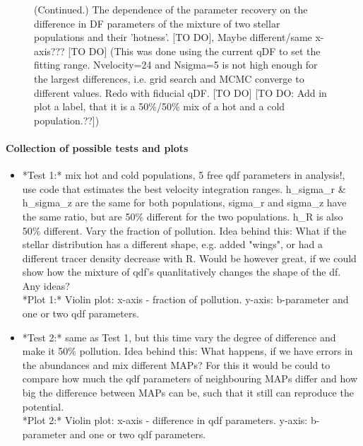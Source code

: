 \documentclass[12pt,preprint]{aastex}
\begin{document}
\addtocounter{figure}{-1}
\begin{figure} [t!]
  \caption{(Continued.) The dependence of the parameter recovery on the difference in DF parameters of the mixture of two stellar populations and their 'hotness'.  [TO DO], Maybe different/same x-axis??? [TO DO] (This was done using the current qDF to set the fitting range. Nvelocity=24 and Nsigma=5 is not high enough for the largest differences, i.e. grid search and MCMC converge to different values. Redo with fiducial qDF. [TO DO] [TO DO: Add in plot a label, that it is a 50\%/50\% mix of a hot and a cold population.??])} 
\end{figure}


\paragraph{Collection of possible tests and plots}

\begin{itemize}
\item *Test 1:* mix hot and cold populations, 5 free qdf parameters in analysis!, use code that estimates the best velocity integration ranges. h\_sigma\_r \& h\_sigma\_z are the same for both populations, sigma\_r and sigma\_z have the same ratio, but are 50\% different for the two populations. h\_R is also 50\% different. Vary the fraction of pollution. Idea behind this: What if the stellar distribution has a different shape, e.g. added "wings", or had a different tracer density decrease with R. Would be however great, if we could show how the mixture of qdf's quanlitatively changes the shape of the df. Any ideas? \\
*Plot 1:* Violin plot: x-axis - fraction of pollution. y-axis: b-parameter and one or two qdf parameters.
\item *Test 2:* same as Test 1, but this time vary the degree of difference and make it 50\% pollution. Idea behind this: What happens, if we have errors in the abundances and mix different MAPs? For this it would be could to compare how much the qdf parameters of neighbouring MAPs differ and how big the difference between MAPs can be, such that it still can reproduce the potential. \\
*Plot 2:* Violin plot: x-axis - difference in qdf parameters. y-axis: b-parameter and one or two qdf parameters.
\end{itemize}
\end{document}
